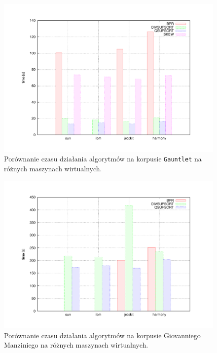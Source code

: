 
\begin{figure}[p]
    \begin{center}
        \includegraphics[width=.9\linewidth]{figures/results/gauntlet-compare.pdf}
    \end{center}        
    \caption{Porównanie czasu działania algorytmów na korpusie \texttt{Gauntlet} na różnych maszynach wirtualnych.}
    \label{rys:gauntlet-vm-compare}
\end{figure}

\begin{figure}[p]
    \begin{center}
        \includegraphics[width=.9\linewidth]{figures/results/manzini-compare.pdf}
        \end{center}        
        \caption{Porównanie czasu działania algorytmów na korpusie Giovanniego Manziniego na różnych maszynach wirtualnych.}
        \label{rys:manzini-vm-compare}
\end{figure}


